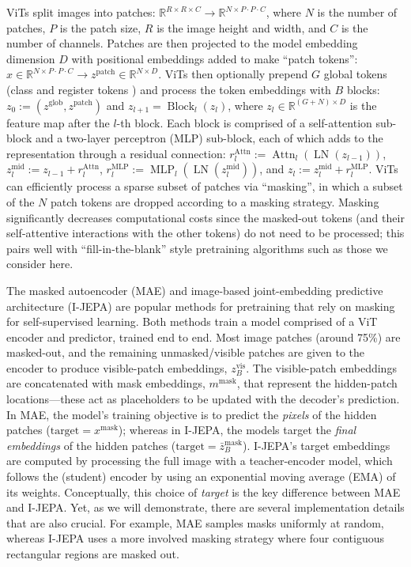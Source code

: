 ViTs \citep{dosovitskiy2021vit} split images into patches: $\mathbb{R}^{R \times R \times C} \to \mathbb{R}^{N \times P \cdot P \cdot C}$, where $N$ is the number of patches, $P$ is the patch size, $R$ is the image height and width, and $C$ is the number of channels.
Patches are then projected to the model embedding dimension $D$ with positional embeddings added to make ``patch tokens'': $x \in \mathbb{R}^{N \times P \cdot P \cdot C} \to z^{\text{patch}} \in \mathbb{R}^{N \times D}$.
ViTs then optionally prepend $G$ global tokens (class and register tokens \citep{darcet2024registers}) and process the token embeddings with $B$ blocks: $z_0:=(z^{\text{glob}},z^{\text{patch}})$ and $z_{l+1}=\operatorname{Block}_l(z_l)$, where $z_l \in  \mathbb{R}^{(G+N) \times D}$ is the feature map after the $l$-th block.
Each block is comprised of a self-attention sub-block and a two-layer perceptron (MLP) sub-block, each of which adds to the representation through a residual connection:
$r_l^\text{Attn} := \operatorname{Attn}_l(\operatorname{LN}(z_{l-1}))$,
$z_l^\text{mid} := z_{l-1} + r_l^\text{Attn}$,
$r_l^\text{MLP}:=\operatorname{MLP}_l(\operatorname{LN}(z_l^\text{mid}))$, and
$z_l := z_l^\text{mid} + r_l^\text{MLP}$.
ViTs can efficiently process a sparse subset of patches via ``masking'', in which a subset of the $N$ patch tokens are dropped according to a masking strategy.
Masking significantly decreases computational costs since the masked-out tokens (and their self-attentive interactions with the other tokens) do not need to be processed;
this pairs well with ``fill-in-the-blank'' style pretraining algorithms such as those we consider here. 

The {masked autoencoder} (MAE) and {image-based joint-embedding predictive architecture} (I-JEPA) are popular methods for pretraining that rely on masking for self-supervised learning.
Both methods train a model comprised of a ViT encoder and predictor, trained end to end.
Most image patches (around 75\%) are masked-out, and the remaining unmasked/visible patches are given to the encoder to produce visible-patch embeddings, $z_B^\text{vis}$.
The visible-patch embeddings are concatenated with mask embeddings, $m^\text{mask}$, that represent the hidden-patch locations---these act as placeholders to be updated with the decoder's prediction.
In MAE, the model's training objective is to predict the \emph{pixels} of the hidden patches ($\text{target}=x^\text{mask}$); whereas in I-JEPA, the models target the \emph{final embeddings} of the hidden patches ($\text{target}=\bar{z}_B^\text{mask}$).
I-JEPA's target embeddings are computed by processing the full image with a teacher-encoder model, which follows the (student) encoder by using an exponential moving average (EMA) of its weights. 
Conceptually, this choice of \emph{target} is the key difference between MAE and I-JEPA.
Yet, as we will demonstrate, there are several implementation details that are also crucial. 
For example, MAE samples masks uniformly at random, whereas I-JEPA uses a more involved masking strategy where four contiguous rectangular regions are masked out.


